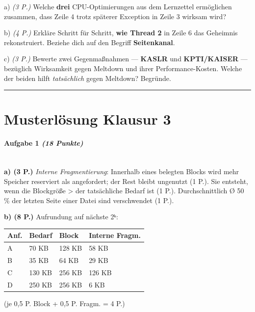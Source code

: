 \documentclass[11pt, a4paper]{article}
\begin{document}
a) \textit{(3 P.)} Welche \textbf{drei} CPU-Optimierungen aus dem Lernzettel ermöglichen zusammen, dass Zeile 4 trotz späterer Exception in Zeile 3 wirksam wird?


b) \textit{(4 P.)} Erkläre Schritt für Schritt, \textbf{wie Thread 2} in Zeile 6 das Geheimnis rekonstruiert. Beziehe dich auf den Begriff \textbf{Seitenkanal}.


c) \textit{(3 P.)} Bewerte zwei Gegenmaßnahmen — \textbf{KASLR} und \textbf{KPTI/KAISER} — bezüglich Wirksamkeit gegen Meltdown und ihrer Performance-Kosten. Welche der beiden hilft \textit{tatsächlich} gegen Meltdown? Begründe.



\noindent\textcolor{rulegray}{\rule{\linewidth}{0.4pt}}



\section{Musterlösung Klausur 3}

\paragraph{Aufgabe 1 \textit{(18 Punkte)}}\mbox{}\\[2pt]

\textbf{a) (3 P.)} \textit{Interne Fragmentierung}: Innerhalb eines belegten Blocks wird mehr Speicher reserviert als angefordert; der Rest bleibt ungenutzt (1 P.). Sie entsteht, wenn die Blockgröße > der tatsächliche Bedarf ist (1 P.). Durchschnittlich Ø 50 \% der letzten Seite einer Datei sind verschwendet (1 P.).


\textbf{b) (8 P.)} Aufrundung auf nächste 2ᵏ:


{\small
\begin{tabularx}{\linewidth}{XXXX}
\hline
\rowcolor{tableheadbg}
{\color{white}\textbf{Anf.}} & {\color{white}\textbf{Bedarf}} & {\color{white}\textbf{Block}} & {\color{white}\textbf{Interne Fragm.}} \\[2pt]
\hline
\endhead
\hline
\endfoot
A & 70 KB & 128 KB & 58 KB \\
B & 35 KB & 64 KB & 29 KB \\
C & 130 KB & 256 KB & 126 KB \\
D & 250 KB & 256 KB & 6 KB \\
\end{tabularx}
}


(je 0,5 P. Block + 0,5 P. Fragm. = 4 P.)
\end{document}

